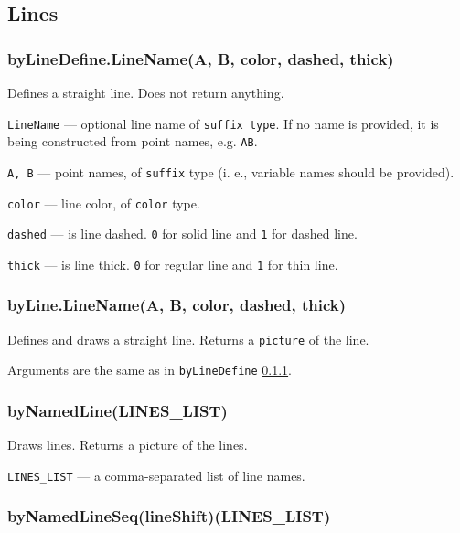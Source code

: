 \documentclass{ltxdoc}
\begin{document}
\subsection{Lines}


\subsubsection{byLineDefine.LineName(A, B, color, dashed, thick)}\label{byLineDefine}

	Defines a straight line. Does not return anything.
	
	\texttt{LineName} — optional line name of \texttt{suffix type}. If no name is provided, it is being constructed from point names, e.g. \texttt{AB}.
	
	\texttt{A, B} — point names, of \texttt{suffix} type (i. e., variable names should be provided).
	
	\texttt{color} — line color, of \texttt{color} type.
	
	\texttt{dashed} — is line dashed. \texttt{0} for solid line and \texttt{1} for dashed line.
	
	\texttt{thick} — is line thick. \texttt{0} for regular line and \texttt{1} for thin line.


\subsubsection{byLine.LineName(A, B, color, dashed, thick)}\label{byLine}

	Defines and draws a straight line. Returns a \texttt{picture} of the line.
	
	Arguments are the same as in \texttt{byLineDefine} \ref{byLineDefine}.


\subsubsection{byNamedLine(LINES\_LIST)}\label{byNamedLine}

	Draws lines. Returns a picture of the lines.
	
	\texttt{LINES\_LIST} — a comma-separated list of line names.

\subsubsection{byNamedLineSeq(lineShift)(LINES\_LIST)}\label{byNamedLineSeq}
	
\end{document}
